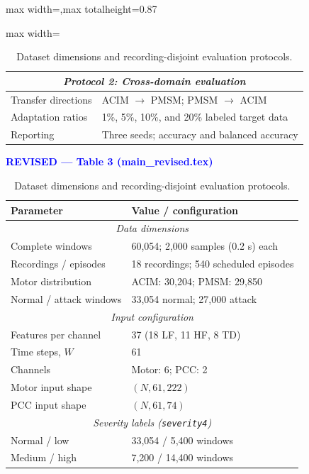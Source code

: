 \documentclass[letterpaper,journal]{IEEEtran}
\begin{document}
\begin{table}[p]
\begin{adjustbox}{max width=\textwidth,max totalheight=0.87\textheight}
\begin{minipage}{\textwidth}
\begin{minipage}[t]{0.48\textwidth}
\begin{adjustbox}{max width=\linewidth}
\begin{tabularx}{\columnwidth}{@{}p{}X@{}}
\hline
\multicolumn{2}{c}{\textit{Protocol 2: Cross-domain evaluation}} \\
\hline
Transfer directions & ACIM $\rightarrow$ PMSM; PMSM $\rightarrow$ ACIM \\
Adaptation ratios   & 1\%, 5\%, 10\%, and 20\% labeled target data \\
Reporting           & Three seeds; accuracy and balanced accuracy \\

\bottomrule
\end{tabularx}\end{adjustbox}

\end{minipage}\hfill%
\begin{minipage}[t]{0.48\textwidth}
\centering
\textcolor{blue}{\textbf{REVISED --- Table 3 (main\_revised.tex)}}\par\smallskip

\centering
\footnotesize
\caption{Dataset dimensions and recording-disjoint
evaluation protocols.}
\label{tab:evaluation_protocols}
\renewcommand{\arraystretch}{1.10}
\setlength{\tabcolsep}{2pt}

\begin{tabular}{@{}p{}p{}@{}}
\hline
Parameter & Value / configuration \\
\hline
\multicolumn{2}{c}{\textit{Data dimensions}} \\
\hline
Complete windows & 60,054; 2,000 samples (0.2 s) each \\
Recordings / episodes & 18 recordings; 540 scheduled episodes \\
Motor distribution & ACIM: 30,204; PMSM: 29,850 \\
Normal / attack windows & 33,054 normal; 27,000 attack \\

\hline
\multicolumn{2}{c}{\textit{Input configuration}} \\
\hline
Features per channel & 37 (18 LF, 11 HF, 8 TD) \\
Time steps, $W$ & 61 \\
Channels & Motor: 6; PCC: 2 \\
Motor input shape & $(N,61,222)$ \\
PCC input shape & $(N,61,74)$ \\

\hline
\multicolumn{2}{c}{\textit{Severity labels (\texttt{severity4})}} \\
\hline
Normal / low & 33,054 / 5,400 windows \\
Medium / high & 7,200 / 14,400 windows \\


\end{tabular}
\end{minipage}
\end{minipage}
\end{adjustbox}
\end{table}
\end{document}
